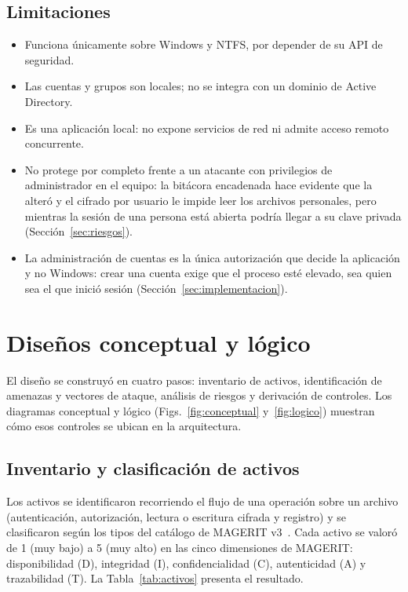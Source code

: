 \documentclass[conference]{IEEEtran}
\begin{document}
\subsection{Limitaciones}
\begin{itemize}
    \item Funciona únicamente sobre Windows y NTFS, por depender de su API de seguridad.
    \item Las cuentas y grupos son locales; no se integra con un dominio de Active Directory.
    \item Es una aplicación local: no expone servicios de red ni admite acceso remoto concurrente.
    \item No protege por completo frente a un atacante con privilegios de administrador en el equipo: la bitácora encadenada hace evidente que la alteró y el cifrado por usuario le impide leer los archivos personales, pero mientras la sesión de una persona está abierta podría llegar a su clave privada (Sección~\ref{sec:riesgos}).
    \item La administración de cuentas es la única autorización que decide la aplicación y no Windows: crear una cuenta exige que el proceso esté elevado, sea quien sea el que inició sesión (Sección~\ref{sec:implementacion}).
\end{itemize}

\section{Diseños conceptual y lógico}
\label{sec:diseno}

El diseño se construyó en cuatro pasos: inventario de activos, identificación de amenazas y vectores de ataque, análisis de riesgos y derivación de controles. Los diagramas conceptual y lógico (Figs.~\ref{fig:conceptual} y~\ref{fig:logico}) muestran cómo esos controles se ubican en la arquitectura.

\subsection{Inventario y clasificación de activos}
Los activos se identificaron recorriendo el flujo de una operación sobre un archivo (autenticación, autorización, lectura o escritura cifrada y registro) y se clasificaron según los tipos del catálogo de MAGERIT v3~\cite{magerit2}. Cada activo se valoró de 1 (muy bajo) a 5 (muy alto) en las cinco dimensiones de MAGERIT: disponibilidad (D), integridad (I), confidencialidad (C), autenticidad (A) y trazabilidad (T). La Tabla~\ref{tab:activos} presenta el resultado.
\end{document}
